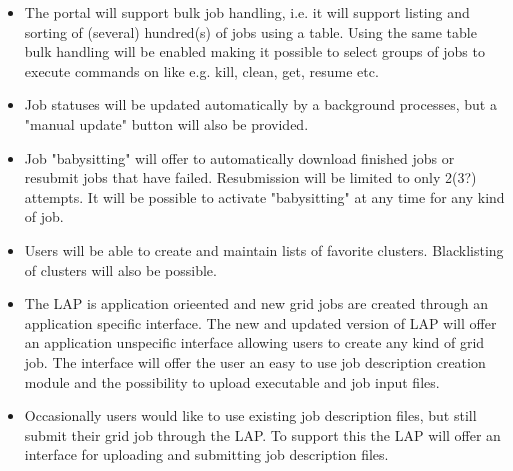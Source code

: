 \documentclass[11pt,oneside,a4paper,english]{article}
\begin{document}
\begin{itemize}
\item{The portal will support bulk job handling, i.e. it will support
  listing and sorting of (several) hundred(s) of jobs using a
  table. Using the same table bulk handling will be enabled making it
  possible to select groups of jobs to execute commands on like
  e.g. kill, clean, get, resume etc. }
\item{Job statuses will be updated automatically by a background
  processes, but a "manual update" button will also be provided.}
\item{Job "babysitting" will offer to automatically download finished
  jobs or resubmit jobs that have failed. Resubmission will be limited
  to only 2(3?) attempts. It will be possible to activate
  "babysitting" at any time for any kind of job.}
\item{Users will be able to create and maintain lists of favorite
  clusters. Blacklisting of clusters will also be possible.}
\item{The LAP is application orieented and new grid jobs are created
  through an application specific interface. The new and updated
  version of LAP will offer an application unspecific interface
  allowing users to create any kind of grid job. The interface will
  offer the user an easy to use job description creation module and
  the possibility to upload executable and job input files.}
\item{Occasionally users would like to use existing job description
  files, but still submit their grid job through the LAP. To support
  this the LAP will offer an interface for uploading and submitting
  job description files.}
\end{itemize}
\end{document}
